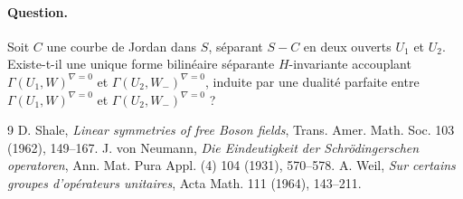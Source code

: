 \documentclass[11pt]{article}
\begin{document}
\paragraph{Question.} Soit $C$ une courbe de Jordan dans $S$, séparant $S-C$ en deux ouverts $U_1$ et $U_2$. Existe-t-il une unique forme bilinéaire séparante $H$-invariante accouplant $\Gamma(U_1,W)^{\nabla=0}$ et $\Gamma(U_2,W_-)^{\nabla=0}$, induite par une dualité parfaite entre $\Gamma(U_1,W)^{\nabla=0}$ et $\Gamma(U_2,W_-)^{\nabla=0}$ ?

\begin{thebibliography}{9}
 D. Shale, \emph{Linear symmetries of free Boson fields}, Trans. Amer. Math. Soc. 103 (1962), 149--167.
 J. von Neumann, \emph{Die Eindeutigkeit der Schrödingerschen operatoren}, Ann. Mat. Pura Appl. (4) 104 (1931), 570--578.
 A. Weil, \emph{Sur certains groupes d'opérateurs unitaires}, Acta Math. 111 (1964), 143--211.
\end{thebibliography}
\end{document}

